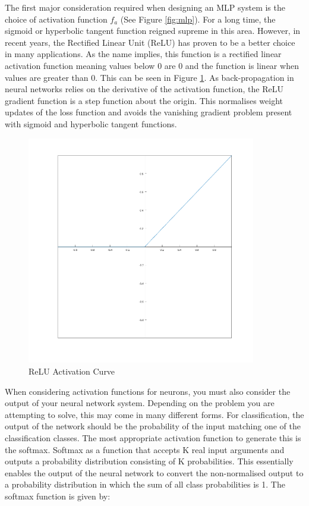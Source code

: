 \documentclass[11pt]{article}
\begin{document}
	\noindent
	The first major consideration required when designing an MLP system is the choice of activation function $f_a$ (See Figure \ref{fig:mlp}). For a long time, the sigmoid or hyperbolic tangent function reigned supreme in this area. However, in recent years, the Rectified Linear Unit (ReLU) has proven to be a better choice in many applications. As the name implies, this function is a rectified linear activation function meaning values below 0 are 0 and the function is linear when values are greater than 0. This can be seen in Figure \ref{fig:relu}. As back-propagation in neural networks relies on the derivative of the activation function, the ReLU gradient function is a step function about the origin. This normalises weight updates of the loss function and avoids the vanishing gradient problem present with sigmoid and hyperbolic tangent functions.\\
		
	\begin{figure}[H]
		\centering
		\includegraphics[width=10cm]{Figures/relu}
		\caption{ReLU Activation Curve}
		\label{fig:relu}
	\end{figure}


	\noindent
	When considering activation functions for neurons, you must also consider the output of your neural network system. Depending on the problem you are attempting to solve, this may come in many different forms. For classification, the output of the network should be the probability of the input matching one of the classification classes. The most appropriate activation function to generate this is the softmax. Softmax as a function that accepts K real input arguments and outputs a probability distribution consisting of K probabilities. This essentially enables the output of the neural network to convert the non-normalised output to a probability distribution in which the sum of all class probabilities is 1. The softmax function is given by:\\
	
\end{document}
